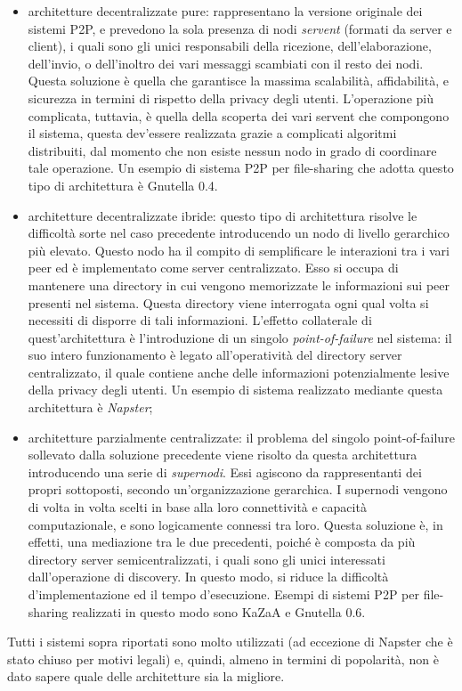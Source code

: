 \begin{itemize}
\item architetture decentralizzate pure: rappresentano la versione originale dei sistemi P2P, e prevedono la sola presenza di nodi \textit{servent} (formati da server e client), i quali sono gli unici responsabili della ricezione, dell’elaborazione, dell’invio, o dell’inoltro dei vari messaggi scambiati con il resto dei nodi. Questa soluzione è quella che garantisce la massima scalabilità, affidabilità, e sicurezza in termini di rispetto della privacy degli utenti. L’operazione più complicata, tuttavia, è quella della scoperta dei vari servent che compongono il sistema, questa dev'essere realizzata grazie a complicati algoritmi distribuiti, dal momento che non esiste nessun nodo in grado di coordinare tale operazione. Un esempio di sistema P2P per file-sharing che adotta questo tipo di architettura è Gnutella 0.4.
\item architetture decentralizzate ibride: questo tipo di architettura risolve le difficoltà sorte nel caso precedente introducendo un nodo di livello gerarchico più elevato. Questo nodo ha il compito di semplificare le interazioni tra i vari peer ed è implementato come server centralizzato. Esso si occupa di mantenere una directory in cui vengono memorizzate le informazioni sui peer presenti nel sistema. Questa directory viene interrogata ogni qual volta si necessiti di disporre di tali informazioni. L’effetto collaterale di quest'architettura è l’introduzione di un singolo 
\textit{point-of-failure} nel sistema: il suo intero funzionamento è legato all’operatività del directory server centralizzato, il quale contiene anche delle informazioni potenzialmente lesive della privacy degli utenti. Un esempio di sistema realizzato mediante questa architettura è \textit{Napster};
\item architetture parzialmente centralizzate: il problema del singolo point-of-failure sollevato dalla soluzione precedente viene risolto da questa architettura introducendo una serie di \textit{supernodi}. Essi agiscono da rappresentanti dei propri sottoposti, secondo un’organizzazione gerarchica. I supernodi vengono di volta in volta scelti in base alla loro connettività e capacità computazionale, e sono logicamente connessi tra loro. Questa soluzione è, in effetti, una mediazione tra le due precedenti, poiché è composta da più directory server semicentralizzati, i quali sono gli unici interessati dall’operazione di discovery. In questo modo, si riduce la difficoltà d'implementazione ed il tempo d'esecuzione. Esempi di sistemi P2P per file-sharing realizzati in questo modo sono KaZaA e Gnutella 0.6.
\end{itemize}
Tutti i sistemi sopra riportati sono molto utilizzati (ad eccezione di Napster che è stato chiuso per motivi legali) e, quindi, almeno in termini di popolarità, non è dato sapere quale delle architetture sia la migliore.
